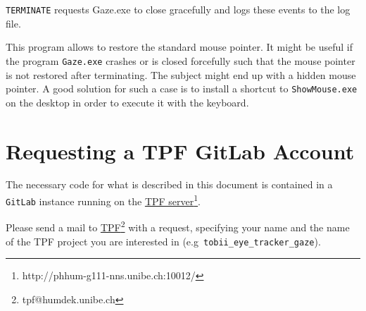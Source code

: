 \documentclass[a4paper,oneside]{book}
\begin{document}
\begin{description}
\begin{description}
            \item{\texttt{TERMINATE}} requests Gaze.exe to close gracefully and logs these events to the log file.
        \end{description}
    \item[ShowMouse.exe] This program allows to restore the standard mouse pointer.
        It might be useful if the program \texttt{Gaze.exe} crashes or is closed forcefully such that the mouse pointer is not restored after terminating.
        The subject might end up with a hidden mouse pointer.
        A good solution for such a case is to install a shortcut to \texttt{ShowMouse.exe} on the desktop in order to execute it with the keyboard.
\end{description}

\section{Requesting a TPF GitLab Account}
\label{sec.gitlab}
The necessary code for what is described in this document is contained in a \texttt{GitLab} instance running on the \href{http://phhum-g111-nns.unibe.ch:10012/}{TPF server}\footnote{http://phhum-g111-nns.unibe.ch:10012/}.

Please send a mail to \href{tpf@humdek.unibe.ch}{TPF}\footnote{tpf@humdek.unibe.ch} with a request, specifying your name and the name of the TPF project you are interested in (e.g~\texttt{tobii\_eye\_tracker\_gaze}).

\end{document}
